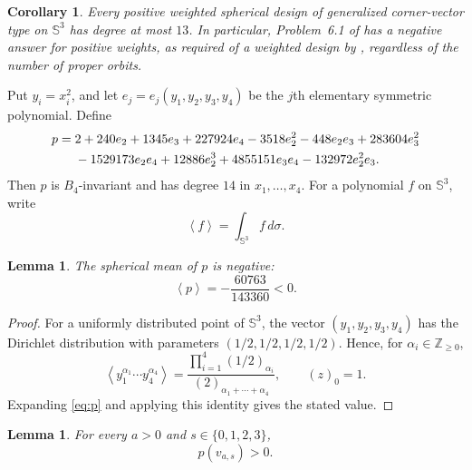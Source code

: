 \documentclass[11pt]{amsart}
\newtheorem{lemma}[theorem]{Lemma}
\newtheorem{corollary}[theorem]{Corollary}
\theoremstyle{remark}
\newcommand{\Sph}{\mathbb{S}}
\newcommand{\mean}[1]{\left\langle #1\right\rangle}
\begin{document}
\begin{corollary}\label{cor:problem}
Every positive weighted spherical design of generalized corner-vector
type on $\Sph^3$ has degree at most $13$. In particular,
Problem~6.1 of \cite{TTHS} has a negative answer for positive weights,
as required of a weighted design by \cite[Definition~2.2]{TTHS},
regardless of the number of proper orbits.
\end{corollary}

Put $y_i=x_i^2$, and let $e_j=e_j(y_1,y_2,y_3,y_4)$ be the $j$th
elementary symmetric polynomial. Define
\begin{align}\label{eq:p}
p={}&
2+240e_2+1345e_3+227924e_4
-3518e_2^2-448e_2e_3+283604e_3^2 \notag\\
&-1529173e_2e_4+12886e_2^3
+4855151e_3e_4-132972e_2^2e_3.
\end{align}
Then $p$ is $B_4$-invariant and has degree $14$ in
$x_1,\ldots,x_4$. For a polynomial $f$ on $\Sph^3$, write
\[
\mean{f}=\int_{\Sph^3}f\,d\sigma.
\]

\begin{lemma}\label{lem:mean}
The spherical mean of $p$ is negative:
\[
\mean{p}=-\frac{60763}{143360}<0.
\]
\end{lemma}

\begin{proof}
For a uniformly distributed point of $\Sph^3$, the vector
$(y_1,y_2,y_3,y_4)$ has the Dirichlet distribution with parameters
$(1/2,1/2,1/2,1/2)$. Hence, for
$\alpha_i\in\mathbb{Z}_{\ge0}$,
\[
\mean{y_1^{\alpha_1}\cdots y_4^{\alpha_4}}
=
\frac{\prod_{i=1}^{4}(1/2)_{\alpha_i}}
     {(2)_{\alpha_1+\cdots+\alpha_4}},
\qquad (z)_0=1.
\]
Expanding \eqref{eq:p} and applying this identity gives the stated
value.
\end{proof}

\begin{lemma}\label{lem:positive}
For every $a>0$ and $s\in\{0,1,2,3\}$,
\[
p(v_{a,s})>0.
\]
\end{lemma}
\end{document}
